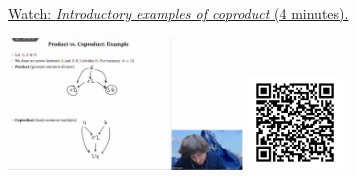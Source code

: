 
\begin{minipage}{10cm}
    \href{https://act4e-spring21.netlify.app/videos/spring2021-coproducts:coproducts:coprod-intro-ex.html}{Watch: \emph{Introductory examples of coproduct} (4 minutes).}
        
    \href{https://act4e-spring21.netlify.app/videos/spring2021-coproducts:coproducts:coprod-intro-ex.html}{\includegraphics[height=3.5cm]{spring2021-coproducts:coproducts:coprod-intro-ex/thumbnails.jpg}}
    \href{https://act4e-spring21.netlify.app/videos/spring2021-coproducts:coproducts:coprod-intro-ex.html}{\includegraphics[height=2.5cm]{spring2021-coproducts:coproducts:coprod-intro-ex/qrcode.png}}
\end{minipage}
